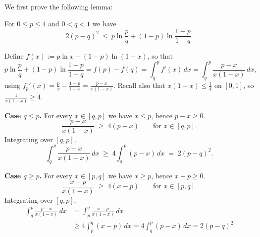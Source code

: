 \documentclass[fontsize=11pt, parskip=half]{scrartcl}
\begin{document}
We first prove the following lemma:

\begin{lemma}\label{lem:pinsker_binary}
    For $0 \leq p \leq 1$ and $0 < q < 1$ we have
    \[
        2(p-q)^2 ~\leq~ p \ln \frac{p}{q} + (1-p) \ln \frac{1-p}{1-q}.
    \]
    \end{lemma}
    
    
    
    
    Define $f(x) := p \ln x + (1-p) \ln (1-x)$, so that
    \[
    p \ln \frac{p}{q} + (1-p) \ln \frac{1-p}{1-q} = f(p) - f(q)
    = \int_q^p f'(x)\, dx
    = \int_q^p \frac{p-x}{x(1-x)}\, dx,
    \]
    using $f_p'(x) = \frac{p}{x} - \frac{1-p}{1-x} = \frac{p-x}{x(1-x)}$. Recall also that $x(1-x) \leq \tfrac14$ on $[0,1]$, so $\frac{1}{x(1-x)} \geq 4$.
    
    \textbf{Case $q \leq p$.} For every $x \in [q,p]$ we have $x \leq p$, hence $p - x \geq 0$.
    \[
    \frac{p-x}{x(1-x)} \;\geq\; 4(p-x) \qquad \text{for } x \in [q,p].
    \]
    Integrating over $[q,p]$,
    \[
    \int_q^p \frac{p-x}{x(1-x)}\, dx \;\geq\; 4 \int_q^p (p-x)\, dx \;=\; 2(p-q)^2.
    \]
    
    \textbf{Case $q \geq p$.} For every $x \in [p,q]$ we have $x \geq p$, hence $x - p \geq 0$. 
    \[
    \frac{x-p}{x(1-x)} \;\geq\; 4(x-p) \qquad \text{for } x \in [p,q].
    \]
    Integrating over $[q,p]$,
    \begin{align*}
    \int_q^p \frac{p-x}{x(1-x)}\, dx
    &= \int_p^q \frac{x-p}{x(1-x)}\, dx \\
    &\geq 4 \int_p^q (x-p)\, dx
    = 4 \int_q^p (p-x)\, dx
    = 2(p-q)^2
    \end{align*}
\end{document}
